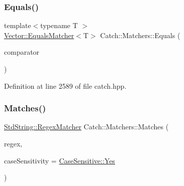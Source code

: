 \mbox{\label{namespace_catch_1_1_matchers_a332a401fb0da33c988e9cfa400ecce1b}} 
\subsubsection{\texorpdfstring{Equals()}{Equals()}\hspace{0.1cm}{\footnotesize\ttfamily [2/2]}}
{\footnotesize\ttfamily template$<$typename T $>$ \\
\mbox{\hyperlink{struct_catch_1_1_matchers_1_1_vector_1_1_equals_matcher}{Vector\+::\+Equals\+Matcher}}$<$T$>$ Catch\+::\+Matchers\+::\+Equals (\begin{DoxyParamCaption}\item[{std\+::vector$<$ T $>$ const \&}]{comparator }\end{DoxyParamCaption})}



Definition at line 2589 of file catch.\+hpp.

\mbox{\label{namespace_catch_1_1_matchers_a82f1893cf50ae4c14b9b3e0980bf22b8}} 
\subsubsection{\texorpdfstring{Matches()}{Matches()}}
{\footnotesize\ttfamily \mbox{\hyperlink{struct_catch_1_1_matchers_1_1_std_string_1_1_regex_matcher}{Std\+String\+::\+Regex\+Matcher}} Catch\+::\+Matchers\+::\+Matches (\begin{DoxyParamCaption}\item[{std\+::string const \&}]{regex,  }\item[{\mbox{\hyperlink{struct_catch_1_1_case_sensitive_aad49d3aee2d97066642fffa919685c6a}{Case\+Sensitive\+::\+Choice}}}]{case\+Sensitivity = {\ttfamily \mbox{\hyperlink{struct_catch_1_1_case_sensitive_aad49d3aee2d97066642fffa919685c6aa7c5550b69ec3c502e6f609b67f9613c6}{Case\+Sensitive\+::\+Yes}}} }\end{DoxyParamCaption})}

\mbox{\label{namespace_catch_1_1_matchers_a97c9ee09a70378ca7e8c6f9f01b0d6d1}} 
